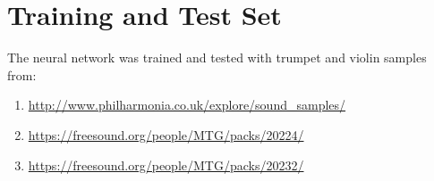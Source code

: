 \documentclass[12pt]{article}
\begin{document}
\section{Training and Test Set}
The neural network was trained and tested with trumpet and violin samples from:
\begin{enumerate}
	\item
	\href{http://www.philharmonia.co.uk/explore/sound_samples/}{http://www.philharmonia.co.uk/explore/sound\_samples/}
	\item
	\href{https://freesound.org/people/MTG/packs/20224/}{https://freesound.org/people/MTG/packs/20224/}
	\item
	\href{https://freesound.org/people/MTG/packs/20232/}{https://freesound.org/people/MTG/packs/20232/}
\end{enumerate} 
\end{document}
